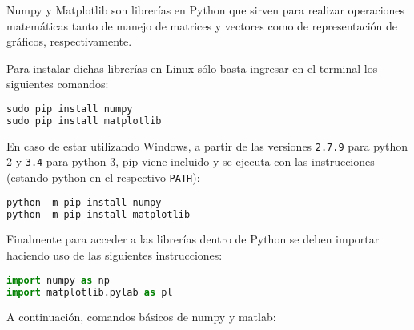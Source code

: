 \documentclass[letterpaper,11pt]{article} %
\begin{document}



Numpy y Matplotlib son librerías en Python que sirven para realizar operaciones matemáticas tanto de manejo de matrices y vectores como de representación de gráficos, respectivamente.

\newp Para instalar dichas librerías en Linux sólo basta ingresar en el terminal los siguientes comandos:

\lstset{style=Python}
\begin{lstlisting}[language=Python]
sudo pip install numpy
sudo pip install matplotlib
\end{lstlisting}

\newp En caso de estar utilizando Windows, a partir de las versiones \texttt{2.7.9} para python 2 y \texttt{3.4} para python 3, pip viene incluido y se ejecuta con las instrucciones (estando python en el respectivo \texttt{PATH}):

\begin{lstlisting}[language=Python]
python -m pip install numpy
python -m pip install matplotlib
\end{lstlisting}

\newp Finalmente para acceder a las librerías dentro de Python se deben importar haciendo uso de las siguientes instrucciones:

\begin{lstlisting}[language=Python]
import numpy as np
import matplotlib.pylab as pl
\end{lstlisting}

\newp A continuación, comandos básicos de numpy y matlab:
\end{document}
